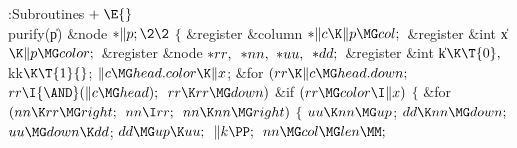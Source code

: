 \Y\B\4:Subroutines\X${}\mathrel+\E{}$\6
\\{purify}(\|p)\1\1\6
\&{node} ${}{*}\|p;\2\2{}$\6
${}\{{}$\5
\1\&{register} \&{column} ${}{*}\|c\K\|p\MG\\{col};{}$\6
\&{register} \&{int} \|x${}\K\|p\MG\\{color};{}$\6
\&{register} \&{node} ${}{*}\\{rr},{}$ ${}{*}\\{nn},{}$ ${}{*}\\{uu},{}$ ${}{*}%
\\{dd};{}$\6
\&{register} \&{int} \|k${}\K\T{0},{}$ \\{kk}${}\K\T{1}{}$;\7
${}\|c\MG\\{head}.\\{color}\K\|x{}$;\6
\&{for} ${}(\\{rr}\K\|c\MG\\{head}.\\{down};{}$ ${}\\{rr}\I{\AND}(\|c\MG%
\\{head});{}$ ${}\\{rr}\K\\{rr}\MG\\{down}){}$\1\6
\&{if} ${}(\\{rr}\MG\\{color}\I\|x){}$\5
${}\{{}$\1\6
\&{for} ${}(\\{nn}\K\\{rr}\MG\\{right};{}$ ${}\\{nn}\I\\{rr};{}$ ${}\\{nn}\K%
\\{nn}\MG\\{right}){}$\5
${}\{{}$\1\6
${}\\{uu}\K\\{nn}\MG\\{up}{}$;\5
${}\\{dd}\K\\{nn}\MG\\{down};{}$\6
${}\\{uu}\MG\\{down}\K\\{dd}{}$;\5
${}\\{dd}\MG\\{up}\K\\{uu};{}$\6
${}\|k\PP;{}$\6
${}\\{nn}\MG\\{col}\MG\\{len}\MM;{}$\6
